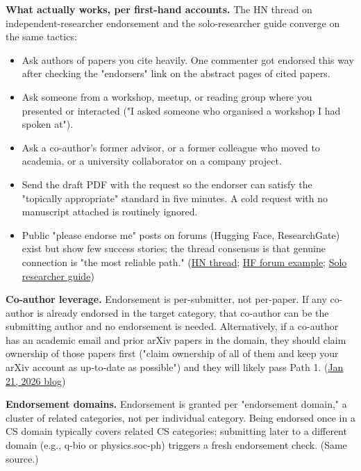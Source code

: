 \documentclass[twocolumn,10pt,letterpaper]{article}
\begin{document}
\textbf{What actually works, per first-hand accounts.} The HN thread on independent-researcher endorsement and the solo-researcher guide converge on the same tactics:


\begin{itemize}
\setlength{\itemsep}{0pt}
\setlength{\parskip}{0pt}
  \item Ask authors of papers you cite heavily. One commenter got endorsed this way after checking the "endorsers" link on the abstract pages of cited papers.
  \item Ask someone from a workshop, meetup, or reading group where you presented or interacted ("I asked someone who organised a workshop I had spoken at").
  \item Ask a co-author's former advisor, or a former colleague who moved to academia, or a university collaborator on a company project.
  \item Send the draft PDF with the request so the endorser can satisfy the "topically appropriate" standard in five minutes. A cold request with no manuscript attached is routinely ignored.
  \item Public "please endorse me" posts on forums (Hugging Face, ResearchGate) exist but show few success stories; the thread consensus is that genuine connection is "the most reliable path." (\href{https://news.ycombinator.com/item?id=46243256}{HN thread}; \href{https://discuss.huggingface.co/t/seeking-arxiv-cs-ai-endorsement-independent-researcher-preprint-on-emergent-identities-in-llms/168007}{HF forum example}; \href{https://learnedgeek.com/Blog/Post/solo-researcher-guide-arxiv}{Solo researcher guide})
\end{itemize}

\textbf{Co-author leverage.} Endorsement is per-submitter, not per-paper. If any co-author is already endorsed in the target category, that co-author can be the submitting author and no endorsement is needed. Alternatively, if a co-author has an academic email and prior arXiv papers in the domain, they should claim ownership of those papers first ("claim ownership of all of them and keep your arXiv account as up-to-date as possible") and they will likely pass Path 1. (\href{https://blog.arxiv.org/2026/01/21/attention-authors-updated-endorsement-policy/}{Jan 21, 2026 blog})


\textbf{Endorsement domains.} Endorsement is granted per "endorsement domain," a cluster of related categories, not per individual category. Being endorsed once in a CS domain typically covers related CS categories; submitting later to a different domain (e.g., q-bio or physics.soc-ph) triggers a fresh endorsement check. (Same source.)
\end{document}
